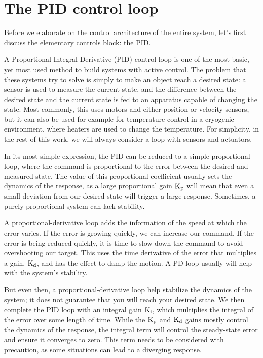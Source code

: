 \documentclass{standalone}
\begin{document}
\chapter{The PID control loop}
\label{ap:PID}

Before we elaborate on the control architecture of the entire system, let's first discuss the elementary controls block: the PID.

A Proportional-Integral-Derivative (PID) control loop is one of the most basic, yet most used method to build systems with active control. The problem that these systems try to solve is simply to make an object reach a desired state: a sensor is used to measure the current state, and the difference between the desired state and the current state is fed to an apparatus capable of changing the state. Most commonly, this uses motors and either position or velocity sensors, but it can also be used for example for temperature control in a cryogenic environment, where heaters are used to change the temperature. For simplicity, in the rest of this work, we will always consider a loop with sensors and actuators. 

In its most simple expression, the PID can be reduced to a simple proportional loop, where the command is proportional to the error between the desired and measured state. The value of this proportional coefficient usually sets the dynamics of the response, as a large proportional gain $\textrm{K}_\textrm{p}$ will mean that even a small deviation from our desired state will trigger a large response. Sometimes, a purely proportional system can lack stability.

A proportional-derivative loop adds the information of the speed at which the error varies. If the error is growing quickly, we can increase our command. If the error is being reduced quickly, it is time to slow down the command to avoid overshooting our target. This uses the time derivative of the error that multiplies a gain, $\textrm{K}_\textrm{d}$, and has the effect to damp the motion. A PD loop usually will help with the system's stability.

But even then, a proportional-derivative loop help stabilize the dynamics of the system; it does not guarantee that you will reach your desired state. We then complete the PID loop with an integral gain $\textrm{K}_\textrm{i}$, which multiplies the integral of the error over some length of time.  While the $\textrm{K}_\textrm{p}$ and $\textrm{K}_\textrm{d}$ gains mostly control the dynamics of the response, the integral term will control the steady-state error and ensure it converges to zero. This term needs to be considered with precaution, as some situations can lead to a diverging response.
\end{document}
